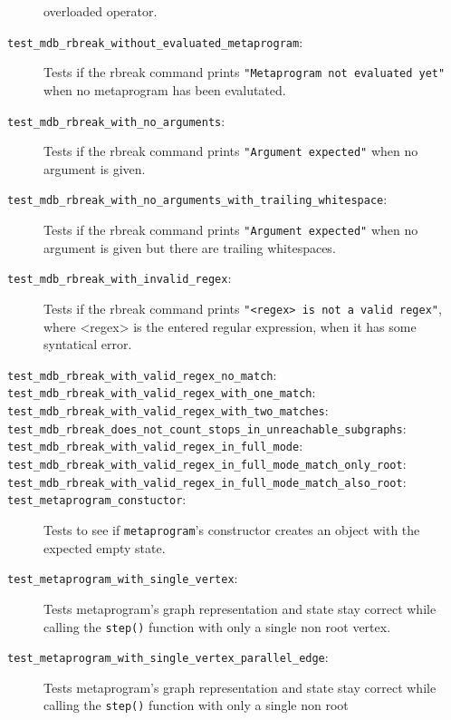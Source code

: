 \begin{description}
        overloaded operator.
    \item[\texttt{test\_mdb\_rbreak\_without\_evaluated\_metaprogram}:]
        Tests if the rbreak command prints
        \texttt{"Metaprogram not evaluated yet"} when no metaprogram has been
        evalutated.
    \item[\texttt{test\_mdb\_rbreak\_with\_no\_arguments}:]
        Tests if the rbreak command prints
        \texttt{"Argument expected"} when no argument is given.
    \item[\texttt{test\_mdb\_rbreak\_with\_no\_arguments\_with\_trailing\_whitespace}:]
        Tests if the rbreak command prints
        \texttt{"Argument expected"} when no argument is given but there are
        trailing whitespaces.
    \item[\texttt{test\_mdb\_rbreak\_with\_invalid\_regex}:]
        Tests if the rbreak command prints
        \texttt{"<regex> is not a valid regex"}, where <regex> is the entered
        regular expression, when it has some syntatical error.
    \item[\texttt{test\_mdb\_rbreak\_with\_valid\_regex\_no\_match}:]
    \item[\texttt{test\_mdb\_rbreak\_with\_valid\_regex\_with\_one\_match}:]
    \item[\texttt{test\_mdb\_rbreak\_with\_valid\_regex\_with\_two\_matches}:]
    \item[\texttt{test\_mdb\_rbreak\_does\_not\_count\_stops\_in\_unreachable\_subgraphs}:]
    \item[\texttt{test\_mdb\_rbreak\_with\_valid\_regex\_in\_full\_mode}:]
    \item[\texttt{test\_mdb\_rbreak\_with\_valid\_regex\_in\_full\_mode\_match\_only\_root}:]
    \item[\texttt{test\_mdb\_rbreak\_with\_valid\_regex\_in\_full\_mode\_match\_also\_root}:]
    \item[\texttt{test\_metaprogram\_constuctor}:]
        Tests to see if \texttt{metaprogram}'s constructor creates an object
        with the expected empty state.
    \item[\texttt{test\_metaprogram\_with\_single\_vertex}:]
        Tests metaprogram's graph representation and state stay correct while
        calling the \texttt{step()} function with only a single non root
        vertex.
    \item[\texttt{test\_metaprogram\_with\_single\_vertex\_parallel\_edge}:]
        Tests metaprogram's graph representation and state stay correct while
        calling the \texttt{step()} function with only a single non root

\end{description}
